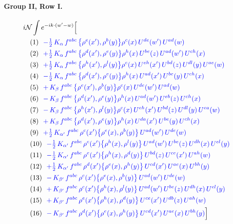 \documentclass[10pt]{article}
\numberwithin{equation}{section}
\newcommand{\NN}{\mathcal N}
\begin{document}
\paragraph{Group II, Row I.}
\begin{align*}
&i\NN\int e^{-ik\cdot(w'-w)}\Big[\\
&\quad\text{(1)}\ \ \textcolor{blue}{- \tfrac12\,K_{\alpha}\,f^{abc}\,\big\{\rho^{e}(x'),\rho^{b}(y)\big\}\rho^{c}(x)\,U^{de}(w')\,U^{ad}(w)}\\
&\quad\text{(2)}\ \ \textcolor{blue}{+\tfrac12\,K_{\alpha}\,f^{abc}\,\big\{\rho^{d}(x'),\rho^{e}(y)\big\}\rho^{h}(x)\,U^{be}(z)\,U^{ad}(w')\,U^{ch}(x)}\\
&\quad\text{(3)}\ \ \textcolor{blue}{+\tfrac12\,K_{\alpha}\,f^{abc}\,\big\{\rho^{h}(x'),\rho^{l}(y)\big\}\rho^{c}(x)\,U^{eh}(x')\,U^{bd}(z)\,U^{dl}(y)\,U^{ae}(w)}\\
&\quad\text{(4)}\ \ \textcolor{blue}{- \tfrac12\,K_{\alpha}\,f^{abc}\,\big\{\rho^{d}(x'),\rho^{e}(y)\big\}\rho^{h}(x)\,U^{ad}(x')\,U^{be}(y)\,U^{ch}(x)}\\
&\quad\text{(5)}\ \ \textcolor{blue}{+\,K_{\beta}\,f^{abc}\,\big\{\rho^{e}(x'),\rho^{b}(y)\big\}\rho^{c}(x)\,U^{de}(w')\,U^{ad}(w)}\\
&\quad\text{(6)}\ \ \textcolor{blue}{-\,K_{\beta}\,f^{abc}\,\big\{\rho^{d}(x'),\rho^{e}(y)\big\}\rho^{h}(x)\,U^{ad}(w')\,U^{eb}(z)\,U^{ch}(x)}\\
&\quad\text{(7)}\ \ \textcolor{blue}{-\,K_{\beta}\,f^{abc}\,\big\{\rho^{h}(x'),\rho^{l}(y)\big\}\rho^{c}(x)\,U^{eh}(x')\,U^{bd}(z)\,U^{dl}(y)\,U^{ea}(w)}\\
&\quad\text{(8)}\ \ \textcolor{blue}{+\,K_{\beta}\,f^{abc}\,\big\{\rho^{d}(x'),\rho^{e}(y)\big\}\rho^{h}(x)\,U^{da}(x')\,U^{be}(y)\,U^{ch}(x)}\\
&\quad\text{(9)}\ \ \textcolor{blue}{+\tfrac12\,K_{\alpha'}\,f^{abc}\,\rho^{c}(x')\big\{\rho^{e}(x),\rho^{b}(y)\big\}\,U^{ad}(w')\,U^{de}(w)}\\
&\quad\text{(10)}\ \ \textcolor{blue}{- \tfrac12\,K_{\alpha'}\,f^{abc}\,\rho^{c}(x')\big\{\rho^{h}(x),\rho^{l}(y)\big\}\,U^{ad}(w')\,U^{be}(z)\,U^{dh}(x)\,U^{el}(y)}\\
&\quad\text{(11)}\ \ \textcolor{blue}{- \tfrac12\,K_{\alpha'}\,f^{abc}\,\rho^{e}(x')\big\{\rho^{h}(x),\rho^{d}(y)\big\}\,U^{bd}(z)\,U^{ce}(x')\,U^{ah}(w)}\\
&\quad\text{(12)}\ \ \textcolor{blue}{+\tfrac12\,K_{\alpha'}\,f^{abc}\,\rho^{d}(x')\big\{\rho^{e}(x),\rho^{h}(y)\big\}\,U^{cd}(x')\,U^{ae}(x)\,U^{bh}(y)}\\
&\quad\text{(13)}\ \ \textcolor{blue}{-\,K_{\beta'}\,f^{abc}\,\rho^{c}(x')\big\{\rho^{e}(x),\rho^{b}(y)\big\}\,U^{ad}(w')\,U^{de}(w)}\\
&\quad\text{(14)}\ \ \textcolor{blue}{+\,K_{\beta'}\,f^{abc}\,\rho^{c}(x')\big\{\rho^{h}(x),\rho^{l}(y)\big\}\,U^{ad}(w')\,U^{be}(z)\,U^{dh}(x)\,U^{el}(y)}\\
&\quad\text{(15)}\ \ \textcolor{blue}{+\,K_{\beta'}\,f^{abc}\,\rho^{e}(x')\big\{\rho^{h}(x),\rho^{d}(y)\big\}\,U^{ce}(x')\,U^{db}(z)\,U^{ah}(w)}\\
&\quad\text{(16)}\ \ \textcolor{blue}{-\,K_{\beta'}\,f^{abc}\,\rho^{d}(x')\big\{\rho^{e}(x),\rho^{h}(y)\big\}\,U^{cd}(x')\,U^{ae}(x)\,U^{bh}(y)}\Big]
\end{align*}
\end{document}
